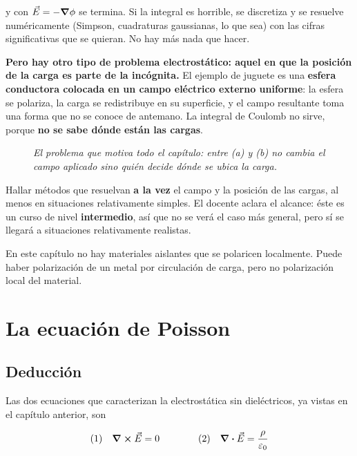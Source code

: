 \documentclass[12pt,a4paper]{article}
\begin{document}
y con $\vec E = -\grad\phi$ se termina. Si la integral es horrible, se discretiza
y se resuelve numéricamente (Simpson, cuadraturas gaussianas, lo que sea) con las
cifras significativas que se quieran. No hay más nada que hacer.

\textbf{Pero hay otro tipo de problema electrostático: aquel en que la posición
de la carga es parte de la incógnita.} El ejemplo de juguete es una \textbf{esfera
conductora colocada en un campo eléctrico externo uniforme}: la esfera se
polariza, la carga se redistribuye en su superficie, y el campo resultante toma
una forma que no se conoce de antemano. La integral de Coulomb no sirve, porque
\textbf{no se sabe dónde están las cargas}.

\begin{figure}[H]
  \centering
  
  \caption*{\small\itshape El problema que motiva todo el capítulo: entre (a) y
  (b) no cambia el campo aplicado sino quién decide dónde se ubica la carga.}
\end{figure}

\begin{keybox}
Hallar métodos que resuelvan \textbf{a la vez} el campo y la posición de las
cargas, al menos en situaciones relativamente simples. El docente aclara el
alcance: éste es un curso de nivel \textbf{intermedio}, así que no se verá el caso
más general, pero sí se llegará a situaciones relativamente realistas.
\end{keybox}

\begin{notebox}
En este capítulo no hay materiales aislantes que se polaricen localmente. Puede
haber polarización de un metal por circulación de carga, pero no polarización
local del material.
\end{notebox}

\section{La ecuación de Poisson}

\subsection{Deducción}

Las dos ecuaciones que caracterizan la electrostática sin dieléctricos, ya vistas
en el capítulo anterior, son

\[
\text{(1)}\quad \curl \vec E = 0
\qquad\qquad
\text{(2)}\quad \div \vec E = \frac{\rho}{\varepsilon_0}
\]
\end{document}
